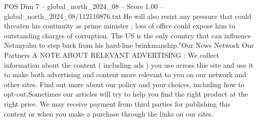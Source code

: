 \begin{textsample}{POS Dim 7 – global\_north\_2024\_08 – Score 1.00 – global\_north\_2024\_08/112110876.txt}
He will also resist any pressure that could threaten his continuity as prime minister ; loss of office could expose him to outstanding charges of corruption.
The US is the only country that can influence Netanyahu to step back from his hard-line brinkmanship."Our News Network Our Partners A NOTE ABOUT RELEVANT ADVERTISING : We collect information about the content ( including ads ) you use across this site and use it to make both advertising and content more relevant to you on our network and other sites.
Find out more about our policy and your choices, including how to opt-out.Sometimes our articles will try to help you find the right product at the right price.
We may receive payment from third parties for publishing this content or when you make a purchase through the links on our sites.

\end{textsample}
